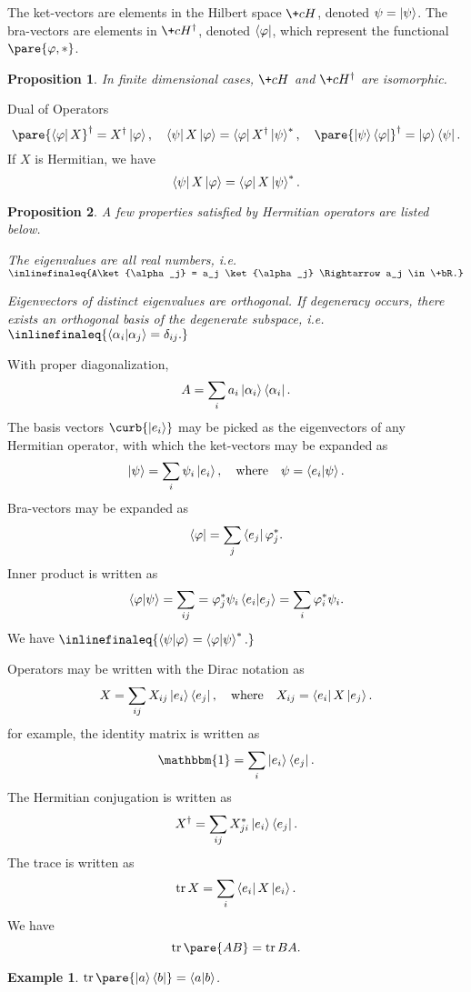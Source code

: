 \documentclass[hidelinks]{article}
\newtheorem{example}{Example}
\newtheorem{proposition}{Proposition}
\begin{document}
The ket-vectors are elements in the Hilbert space $\+cH$, denoted $\psi = \ket{\psi}$. The bra-vectors are elements in $\+cH^\dagger$, denoted $\bra{\varphi}$, which represent the functional $\pare{\varphi,*}$.
\begin{proposition}
    In finite dimensional cases, $\+cH$ and $\+cH^\dagger$ are isomorphic.
\end{proposition}
\vspace{-\baselineskip}
\begin{finaleq}{Dual of Operators}
    \[ \pare{\bra{\varphi}X}^\dagger = X^\dagger\ket{\varphi},\quad \bra{\psi}X\ket{\varphi} = \bra{\varphi}X^\dagger\ket{\psi}^*,\quad \pare{\ket{\psi}\bra{\varphi}}^\dagger = \ket{\varphi}\bra{\psi}. \]
    If $X$ is Hermitian, we have
    \[ \bra{\psi}X\ket{\varphi} = \bra{\varphi}X\ket{\psi}^*. \]
\end{finaleq}
\begin{proposition}
    A few properties satisfied by Hermitian operators are listed below.
    \begin{cenum}
        \item The eigenvalues are all real numbers, i.e. $\inlinefinaleq{A\ket{\alpha_j} = a_j \ket{\alpha_j} \Rightarrow a_j \in \+bR.}$
        \item Eigenvectors of distinct eigenvalues are orthogonal. If degeneracy occurs, there exists an orthogonal basis of the degenerate subspace, i.e. $\inlinefinaleq{\bra{\alpha_i}\ket{\alpha_j} = \delta_{ij}.}$
    \end{cenum}
\end{proposition}
With proper diagonalization,
\[ A = \sum_{i} a_i \ket{\alpha_i}\bra{\alpha_i}. \]
The basis vectors $\curb{\ket{e_i}}$ may be picked as the eigenvectors of any Hermitian operator, with which the ket-vectors may be expanded as
\[ \ket{\psi} = \sum_i \psi_i \ket{e_i},\quad \text{where}\quad \psi = \bra{e_i}\ket{\psi}. \]
Bra-vectors may be expanded as
\[ \bra{\varphi} = \sum_j \bra{e_j}\varphi^*_j. \]
Inner product is written as
\[ \bra{\varphi}\ket{\psi} = \sum_{ij} = \varphi_j^* \psi_i \bra{e_i}\ket{e_j} = \sum_i \varphi_i^* \psi_i. \]
We have $\inlinefinaleq{\bra{\psi}\ket{\varphi} = \bra{\varphi}\ket{\psi}^*.}$
\par
Operators may be written with the Dirac notation as
\[ X = \sum_{ij} X_{ij} \ket{e_i}\bra{e_j},\quad \text{where}\quad X_{ij} = \bra{e_i}X\ket{e_j}. \]
for example, the identity matrix is written as
\[ \mathbbm{1} = \sum_i \ket{e_i}\bra{e_j}. \]
The Hermitian conjugation is written as
\[ X^\dagger = \sum_{ij} X_{ji}^* \ket{e_i}\bra{e_j}. \]
The trace is written as
\[ \trace X = \sum_i \bra{e_i}X\ket{e_i}. \]
We have
\[ \trace \pare{AB} = \trace{BA}. \]
\begin{sample}
    \begin{example}
        $\trace \pare{\ket{a}\bra{b}} = \bra{a}\ket{b}$.
    \end{example}
\end{sample}
\end{document}
